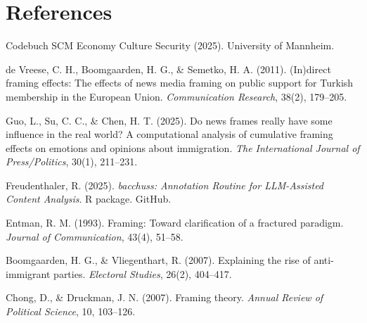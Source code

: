 \documentclass[11pt,a4paper]{article}
\begin{document}
\section*{References}
\begin{enumerate}[label={\textbf{[\arabic*]}},leftmargin=*,itemsep=2pt]
\item Codebuch SCM Economy Culture Security (2025). University of Mannheim.
\item de Vreese, C. H., Boomgaarden, H. G., \& Semetko, H. A. (2011). (In)direct framing effects: The effects of news media framing on public support for Turkish membership in the European Union. \textit{Communication Research}, 38(2), 179--205.
\item Guo, L., Su, C. C., \& Chen, H. T. (2025). Do news frames really have some influence in the real world? A computational analysis of cumulative framing effects on emotions and opinions about immigration. \textit{The International Journal of Press/Politics}, 30(1), 211--231.
\item Freudenthaler, R. (2025). \textit{bacchuss: Annotation Routine for LLM-Assisted Content Analysis}. R package. GitHub.
\item Entman, R. M. (1993). Framing: Toward clarification of a fractured paradigm. \textit{Journal of Communication}, 43(4), 51--58.
\item Boomgaarden, H. G., \& Vliegenthart, R. (2007). Explaining the rise of anti-immigrant parties. \textit{Electoral Studies}, 26(2), 404--417.
\item Chong, D., \& Druckman, J. N. (2007). Framing theory. \textit{Annual Review of Political Science}, 10, 103--126.
\end{enumerate}
\end{document}
